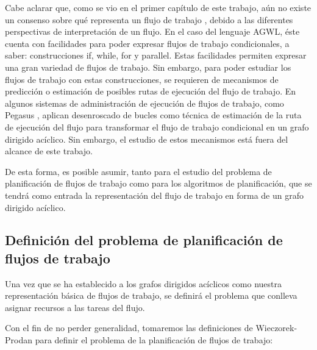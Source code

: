 Cabe aclarar que, como se vio en el primer capítulo de este trabajo, aún no existe un consenso sobre qué representa un flujo de trabajo \cite{van2003workflow}, debido a las diferentes perspectivas de interpretación de un flujo. En el caso del lenguaje AGWL, éste cuenta con facilidades para poder expresar flujos de trabajo condicionales, a saber: construcciones if, while, for y parallel. Estas facilidades permiten expresar una gran variedad de flujos de trabajo. Sin embargo, para poder estudiar los flujos de trabajo con estas construcciones, se requieren de mecanismos de predicción o estimación de posibles rutas de ejecución del flujo de trabajo. En algunos sistemas de administración de ejecución de flujos de trabajo, como Pegasus \cite{deelman2005pegasus}, aplican desenroscado de bucles como técnica de estimación de la ruta de ejecución del flujo para transformar el flujo de trabajo condicional en un grafo dirigido acíclico. Sin embargo, el estudio de estos mecanismos está fuera del alcance de este trabajo.



De esta forma, es posible asumir, tanto para el estudio del problema de planificación de flujos de trabajo como para los algoritmos de planificación, que se tendrá como entrada la representación del flujo de trabajo en forma de un grafo dirigido acíclico.

\subsection{Definición del problema de planificación de flujos de trabajo}
Una vez que se ha establecido a los grafos dirigidos acíclicos como nuestra representación básica de flujos de trabajo, se definirá el problema que conlleva asignar recursos a las tareas del flujo.

Con el fin de no perder generalidad, tomaremos las definiciones de Wieczorek-Prodan \cite{wieczorek2008taxonomies} para definir el problema de la planificación de flujos de trabajo:

